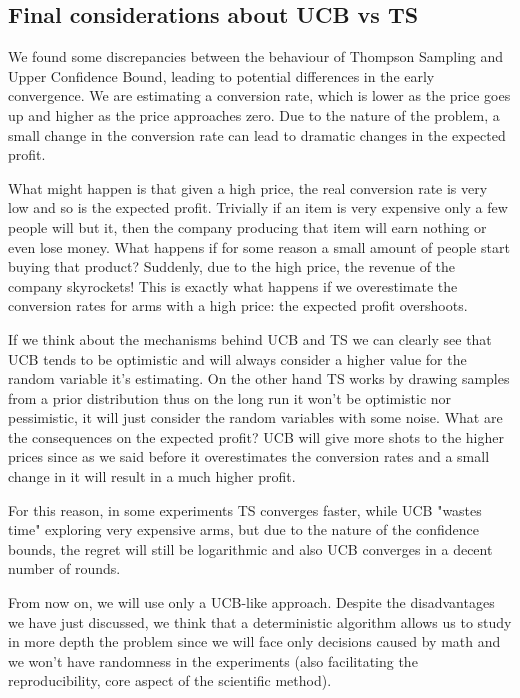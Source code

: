 \documentclass[11pt]{article} %
\begin{document}
\clearpage

{\footnotesize}

\subsection{Final considerations about UCB vs TS}
We found some discrepancies between the behaviour of Thompson Sampling and Upper Confidence Bound, leading to potential
differences in the early convergence. We are estimating a conversion rate, which is lower as the price goes up and higher
as the price approaches zero. Due to the nature of the problem, a small change in the conversion rate can lead to
dramatic changes in the expected profit.

What might happen is that given a high price, the real conversion rate is very low and so is the expected profit. Trivially
if an item is very expensive only a few people will but it, then the company producing that item will earn nothing or
even lose money. What happens if for some reason a small amount of people start buying that product? Suddenly, due to the
high price, the revenue of the company skyrockets! This is exactly what happens if we overestimate the conversion rates
for arms with a high price: the expected profit overshoots.

If we think about the mechanisms behind UCB and TS we can clearly see that UCB tends to be optimistic and will always consider
a higher value for the random variable it's estimating. On the other hand TS works by drawing samples from a prior distribution
thus on the long run it won't be optimistic nor pessimistic, it will just consider the random variables with some noise.
What are the consequences on the expected profit? UCB will give more shots to the higher prices since as we said before
it overestimates the conversion rates and a small change in it will result in a much higher profit.

For this reason, in some experiments TS converges faster, while UCB "wastes time" exploring very expensive arms, but due
to the nature of the confidence bounds, the regret will still be logarithmic and also UCB converges in a decent number
of rounds.

From now on, we will use only a UCB-like approach. Despite the disadvantages we have just discussed, we think that a
deterministic algorithm allows us to study in more depth the problem since we will face only decisions caused by
math and we won't have randomness in the experiments (also facilitating the reproducibility, core aspect of the
scientific method).
\end{document}
